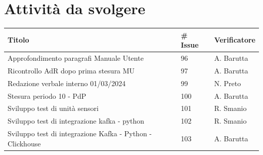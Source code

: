\documentclass{article}
\begin{document}
    \section{Attività da svolgere}
    \begin{center}
        \begin{tabular}{|C{7cm}|C{1,5cm}|C{3cm}|}
            \hline
            \textbf{Titolo} & \textbf{\# Issue} & \textbf{Verificatore} \\
            \hline
            \hline
            Approfondimento paragrafi Manuale Utente & 96 & A. Barutta \\
            \hline
            Ricontrollo AdR dopo prima stesura MU & 97 & A. Barutta \\
            \hline
            Redazione verbale interno 01/03/2024 & 99 & N. Preto \\
            \hline
            Stesura periodo 10 - PdP & 100 & A. Barutta \\
            \hline
            Sviluppo test di unità sensori & 101 & R. Smanio \\
            \hline
            Sviluppo test di integrazione kafka - python & 102 & R. Smanio \\
            \hline
            Sviluppo test di integrazione Kafka - Python - Clickhouse & 103 & A. Barutta \\
            \hline
        \end{tabular}
    \end{center}
\end{document}
